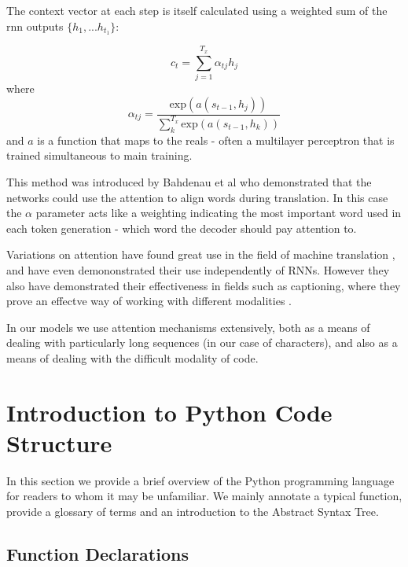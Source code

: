 The context vector at each step is itself calculated using a weighted sum of the rnn outputs $\{h_1,... h_{t_1}\}$:

\begin{equation}
c_t = \sum_{j=1}^{T_x}\alpha_{tj}h_j
\end{equation}
where
\begin{equation}
\alpha_{tj} = \dfrac{\text{exp}(a(s_{t-1}, h_j))}{\sum_k^{T_x}\text{exp}(a(s_{t-1}, h_k))}
\end{equation}
and $a$ is a function that maps to the reals - often a multilayer perceptron that is trained simultaneous to main training. 





This method was introduced by Bahdenau et al \cite{bahdanau_neural_2014} who demonstrated that the networks could use the attention to align words during translation.
In this case the $\alpha$ parameter acts like a weighting indicating the most important word used in each token generation - which word the decoder should pay attention to.

Variations on attention have found great use in the field of machine translation  \cite{luong_effective_2015}, and have even demononstrated their use independently of RNNs\cite{vaswani_attention_2017}. However they also have demonstrated their effectiveness in fields such as captioning, where they prove an effectve way of working with different modalities \cite{xu_show_2015}.

In our models we use attention mechanisms extensively, both as a means of dealing with particularly long sequences (in our case of characters), and also as a means of dealing with the difficult modality of code.




\section{Introduction to Python Code Structure} %
\label{sec:translating_code}


In this section we provide a brief overview of the Python programming language for readers to whom it may be unfamiliar.
We mainly annotate a typical function, provide a glossary of terms and an introduction to the Abstract Syntax Tree.

\subsection{Function Declarations} %
\label{sub:function_declarations}

